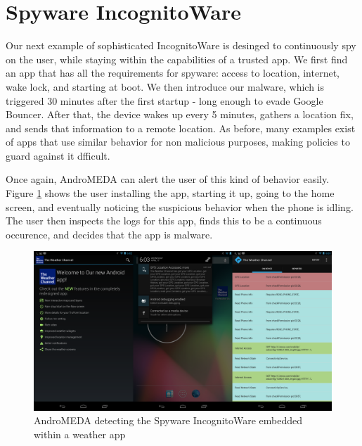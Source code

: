 \section{Spyware IncognitoWare}
Our next example of sophisticated IncognitoWare is desinged to continuously spy on the user, while staying within the capabilities of a trusted app. We first find an app that has all the requirements for spyware: access to location, internet, wake lock, and starting at boot. We then introduce our malware, which is triggered 30 minutes after the first startup - long enough to evade Google Bouncer\citep{mansfield2012android}. After that, the device wakes up every 5 minutes, gathers a location fix, and sends that information to a remote location. As before, many examples exist of apps that use similar behavior for non malicious purposes, making policies to guard against it dfficult.

Once again, AndroMEDA can alert the user of this kind of behavior easily. Figure \ref{fig:spyware_visual} shows the user installing the app, starting it up, going to the home screen, and eventually noticing the suspicious behavior when the phone is idling. The user then inspects the logs for this app, finds this to be a continuous occurence, and decides that the app is malware.

\begin{figure}[h]
\begin{center}
\includegraphics[width=1.0\columnwidth]{figs/weather_detection}
\caption{AndroMEDA detecting the Spyware IncognitoWare embedded within a weather app }
\label{fig:spyware_visual}
\end{center}
\end{figure}


